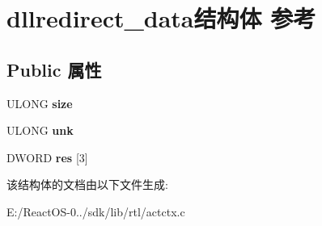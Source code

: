 \hypertarget{structdllredirect__data}{}\section{dllredirect\+\_\+data结构体 参考}
\label{structdllredirect__data}
\subsection*{Public 属性}
\begin{DoxyCompactItemize}
\item 
\mbox{\label{structdllredirect__data_a29e43c637ecb70a221e5a6fc5fef4d7e}} 
U\+L\+O\+NG {\bfseries size}
\item 
\mbox{\label{structdllredirect__data_abf8404e6cecea3b03b71776995aaf8f3}} 
U\+L\+O\+NG {\bfseries unk}
\item 
\mbox{\label{structdllredirect__data_af78ef70cd8efd6c4315ed90cf553ecc2}} 
D\+W\+O\+RD {\bfseries res} \mbox{[}3\mbox{]}
\end{DoxyCompactItemize}


该结构体的文档由以下文件生成\+:\begin{DoxyCompactItemize}
\item 
E\+:/\+React\+O\+S-\/0../sdk/lib/rtl/actctx.\+c\end{DoxyCompactItemize}
